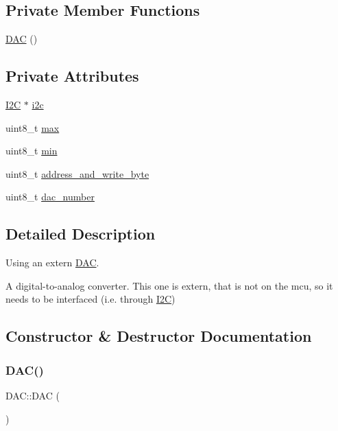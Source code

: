 \subsection*{Private Member Functions}
\begin{DoxyCompactItemize}
\item 
\hyperlink{class_d_a_c_a9908e07a5c096380eeb4c4061d58476d}{D\+AC} ()
\end{DoxyCompactItemize}
\subsection*{Private Attributes}
\begin{DoxyCompactItemize}
\item 
\hyperlink{class_i2_c}{I2C} $\ast$ \hyperlink{class_d_a_c_a70a9fd9603ee9fd9303628bd23338bf5}{i2c}
\item 
uint8\+\_\+t \hyperlink{class_d_a_c_a229a81d8ebf43511dfb6815c5cd8f425}{max}
\item 
uint8\+\_\+t \hyperlink{class_d_a_c_aa4f21cf166374cfc6edcd412f4d2072b}{min}
\item 
uint8\+\_\+t \hyperlink{class_d_a_c_a1dd1e9c4a63f493da44d7208e59cc83e}{address\+\_\+and\+\_\+write\+\_\+byte}
\item 
uint8\+\_\+t \hyperlink{class_d_a_c_afb39aacc3401c892403c477f857504f8}{dac\+\_\+number}
\end{DoxyCompactItemize}


\subsection{Detailed Description}
Using an extern \hyperlink{class_d_a_c}{D\+AC}. 

A digital-\/to-\/analog converter. This one is extern, that is not on the mcu, so it needs to be interfaced (i.\+e. through \hyperlink{class_i2_c}{I2C}) 

\subsection{Constructor \& Destructor Documentation}
\hypertarget{class_d_a_c_a9908e07a5c096380eeb4c4061d58476d}{}\label{class_d_a_c_a9908e07a5c096380eeb4c4061d58476d} 
\subsubsection{\texorpdfstring{D\+A\+C()}{DAC()}\hspace{0.1cm}{\footnotesize\ttfamily [1/2]}}
{\footnotesize\ttfamily D\+A\+C\+::\+D\+AC (\begin{DoxyParamCaption}{ }\end{DoxyParamCaption})\hspace{0.3cm}{\ttfamily [private]}}

